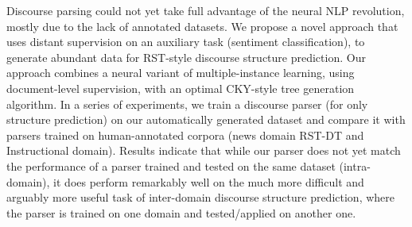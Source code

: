 Discourse parsing could not yet take full advantage of the neural NLP revolution, mostly due to the lack of annotated datasets. We propose a novel approach that uses distant supervision on an auxiliary task (sentiment classification), to generate abundant data for RST-style discourse structure prediction. Our approach combines a neural variant of multiple-instance learning, using document-level supervision, with an optimal CKY-style tree generation algorithm. 
In a series of experiments, we train a discourse parser (for only structure prediction) on our automatically generated dataset and compare it with parsers trained on human-annotated corpora (news domain RST-DT and Instructional domain). Results indicate that while our parser does not yet match the performance of a parser trained and tested on the same dataset (intra-domain), it does perform remarkably well on the much more difficult and arguably more useful task of inter-domain discourse structure prediction, where the parser is trained on one domain and tested/applied on another one.